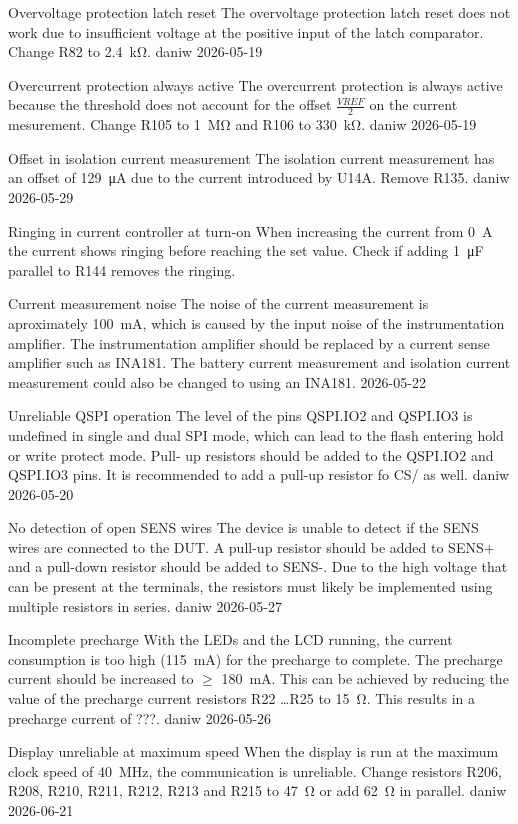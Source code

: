 \begin{ModTable}
\ModItemDone
{Overvoltage protection latch reset}
{The overvoltage protection latch reset does not work due to insufficient voltage at the positive input of the latch comparator. }
{Change R82 to \qty{2.4}{\kilo\ohm}. }
{daniw}
{2026-05-19}

\ModItemDone
{Overcurrent protection always active}
{The overcurrent protection is always active because the threshold does not account for the offset $\frac{VREF}{2}$ on the current mesurement. }
{Change R105 to \qty{1}{\mega\ohm} and R106 to \qty{330}{\kilo\ohm}. }
{daniw}
{2026-05-19}

\ModItemDone
{Offset in isolation current measurement}
{The isolation current measurement has an offset of \qty{129}{\micro\ampere} due to the current introduced by U14A. }
{Remove R135. }
{daniw}
{2026-05-29}

\ModItemOpen
{Ringing in current controller at turn-on}
{When increasing the current from \qty{0}{\ampere} the current shows ringing before reaching the set value. }
{Check if adding \qty{1}{\micro\farad} parallel to R144 removes the ringing. }
{}
{}

\ModItemDone
{Current measurement noise}
{The noise of the current measurement is aproximately \qty{100}{\milli\ampere}, which is caused by the input noise of the instrumentation amplifier. }
{The instrumentation amplifier should be replaced by a current sense amplifier such as INA181. The battery current measurement and isolation current measurement could also be changed to using an INA181. }
{2026-05-22}
{}

\ModItemDone
{Unreliable QSPI operation}
{The level of the pins QSPI.IO2 and QSPI.IO3 is undefined in single and dual SPI mode, which can lead to the flash entering hold or write protect mode. }
{Pull- up resistors should be added to the QSPI.IO2 and QSPI.IO3 pins. It is recommended to add a pull-up resistor fo CS/ as well. }
{daniw}
{2026-05-20}

\ModItemDone
{No detection of open SENS wires}
{The device is unable to detect if the SENS wires are connected to the \ac{DUT}. }
{A pull-up resistor should be added to SENS+ and a pull-down resistor should be added to SENS-. Due to the high voltage that can be present at the terminals, the resistors must likely be implemented using multiple resistors in series. }
{daniw}
{2026-05-27}

\ModItemDone
{Incomplete precharge}
{With the LEDs and the LCD running, the current consumption is too high (\qty{115}{\milli\ampere}) for the precharge to complete. }
{The precharge current should be increased to $\geq$ \qty{180}{\milli\ampere}. This can be achieved by reducing the value of the precharge current resistors R22 \ldots R25 to \qty{15}{\ohm}. This results in a precharge current of ???. }
{daniw}
{2026-05-26}

\ModItemDone
{Display unreliable at maximum speed}
{When the display is run at the maximum clock speed of \qty{40}{\mega\hertz}, the communication is unreliable. }
{Change resistors R206, R208, R210, R211, R212, R213 and R215 to \qty{47}{\ohm} or add \qty{62}{\ohm} in parallel. }
{daniw}
{2026-06-21}

\end{ModTable}

